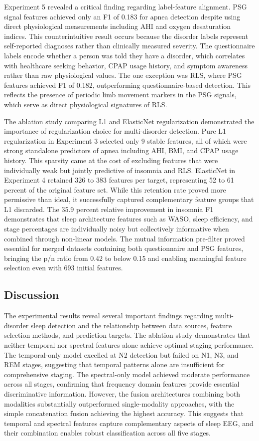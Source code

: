 \documentclass{ieeetj}
\begin{document}
Experiment 5 revealed a critical finding regarding label-feature alignment. PSG signal features achieved only an F1 of 0.183 for apnea detection despite using direct physiological measurements including AHI and oxygen desaturation indices. This counterintuitive result occurs because the disorder labels represent self-reported diagnoses rather than clinically measured severity. The questionnaire labels encode whether a person was told they have a disorder, which correlates with healthcare seeking behavior, CPAP usage history, and symptom awareness rather than raw physiological values. The one exception was RLS, where PSG features achieved F1 of 0.182, outperforming questionnaire-based detection. This reflects the presence of periodic limb movement markers in the PSG signals, which serve as direct physiological signatures of RLS.

The ablation study comparing L1 and ElasticNet regularization demonstrated the importance of regularization choice for multi-disorder detection. Pure L1 regularization in Experiment 3 selected only 9 stable features, all of which were strong standalone predictors of apnea including AHI, BMI, and CPAP usage history. This sparsity came at the cost of excluding features that were individually weak but jointly predictive of insomnia and RLS. ElasticNet in Experiment 4 retained 326 to 383 features per target, representing 52 to 61 percent of the original feature set. While this retention rate proved more permissive than ideal, it successfully captured complementary feature groups that L1 discarded. The 35.9 percent relative improvement in insomnia F1 demonstrates that sleep architecture features such as WASO, sleep efficiency, and stage percentages are individually noisy but collectively informative when combined through non-linear models. The mutual information pre-filter proved essential for merged datasets containing both questionnaire and PSG features, bringing the p/n ratio from 0.42 to below 0.15 and enabling meaningful feature selection even with 693 initial features.

\subsection{Discussion}

The experimental results reveal several important findings regarding multi-disorder sleep detection and the relationship between data sources, feature selection methods, and prediction targets. The ablation study demonstrates that neither temporal nor spectral features alone achieve optimal staging performance. The temporal-only model excelled at N2 detection but failed on N1, N3, and REM stages, suggesting that temporal patterns alone are insufficient for comprehensive staging. The spectral-only model achieved moderate performance across all stages, confirming that frequency domain features provide essential discriminative information. However, the fusion architectures combining both modalities substantially outperformed single-modality approaches, with the simple concatenation fusion achieving the highest accuracy. This suggests that temporal and spectral features capture complementary aspects of sleep EEG, and their combination enables robust classification across all five stages.
\end{document}
